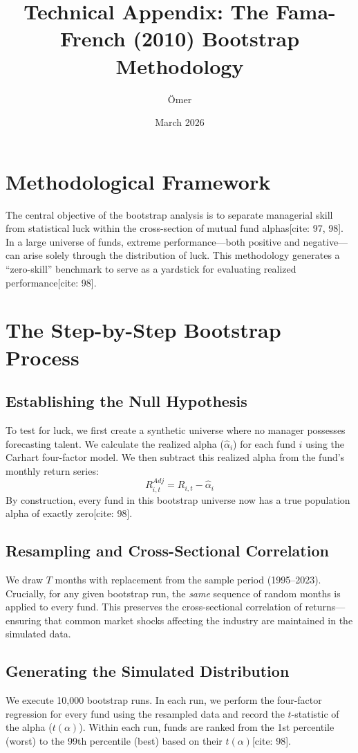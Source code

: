 \documentclass[12pt,a4paper]{article}
\title{Technical Appendix: The Fama-French (2010) Bootstrap Methodology}
\author{Ömer}
\date{March 2026}
\begin{document}
\maketitle

\section{Methodological Framework}
The central objective of the bootstrap analysis is to separate managerial skill from statistical luck within the cross-section of mutual fund alphas[cite: 97, 98]. In a large universe of funds, extreme performance—both positive and negative—can arise solely through the distribution of luck. This methodology generates a ``zero-skill'' benchmark to serve as a yardstick for evaluating realized performance[cite: 98].

\section{The Step-by-Step Bootstrap Process}

\subsection{Establishing the Null Hypothesis}
To test for luck, we first create a synthetic universe where no manager possesses forecasting talent. We calculate the realized alpha ($\hat{\alpha}_i$) for each fund $i$ using the Carhart four-factor model. We then subtract this realized alpha from the fund’s monthly return series:
\begin{equation}
    R_{i,t}^{Adj} = R_{i,t} - \hat{\alpha}_i
\end{equation}
By construction, every fund in this bootstrap universe now has a true population alpha of exactly zero[cite: 98].

\subsection{Resampling and Cross-Sectional Correlation}
We draw $T$ months with replacement from the sample period (1995--2023). Crucially, for any given bootstrap run, the \textit{same} sequence of random months is applied to every fund. This preserves the cross-sectional correlation of returns—ensuring that common market shocks affecting the industry are maintained in the simulated data.

\subsection{Generating the Simulated Distribution}
We execute 10,000 bootstrap runs. In each run, we perform the four-factor regression for every fund using the resampled data and record the $t$-statistic of the alpha ($t(\alpha)$). Within each run, funds are ranked from the 1st percentile (worst) to the 99th percentile (best) based on their $t(\alpha)$[cite: 98].
\end{document}
